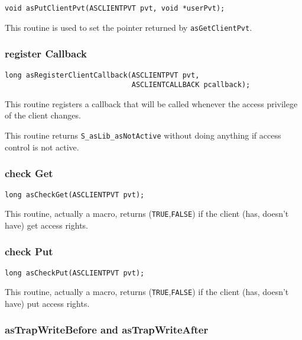\begin{verbatim}
void asPutClientPvt(ASCLIENTPVT pvt, void *userPvt); 
\end{verbatim}

This routine is used to set the pointer returned by \verb|asGetClientPvt|.

\subsubsection{register Callback}

\begin{verbatim}
long asRegisterClientCallback(ASCLIENTPVT pvt,
                              ASCLIENTCALLBACK pcallback);
\end{verbatim}

This routine registers a callback that will be called whenever the access privilege of the client changes.

This routine returns \verb|S_asLib_asNotActive| without doing anything if access control is not active.

\subsubsection{check Get}

\begin{verbatim}
long asCheckGet(ASCLIENTPVT pvt); 
\end{verbatim}

This routine, actually a macro, returns (\verb|TRUE|,\verb|FALSE|) if the client (has, doesn't have) get access rights.

\subsubsection{check Put}

\begin{verbatim}
long asCheckPut(ASCLIENTPVT pvt);
\end{verbatim}

This routine, actually a macro, returns (\verb|TRUE|,\verb|FALSE|) if the client (has, doesn't have) put access rights.

\subsubsection{asTrapWriteBefore and asTrapWriteAfter}

